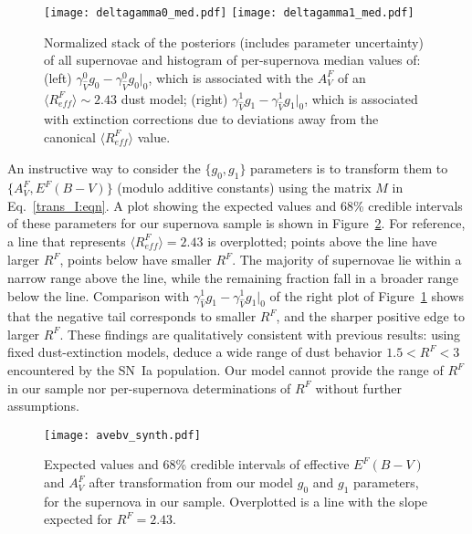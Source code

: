 \documentclass[trackchanges]{aastex62}   	%
\begin{document}
\begin{figure}[htbp] %
   \centering
   \texttt{[image: deltagamma0\_med.pdf]}
   \texttt{[image: deltagamma1\_med.pdf]}
      \caption{
      Normalized stack of the posteriors (includes parameter uncertainty) of all supernovae  and histogram 
      of  per-supernova 
median values of: (left) $\gamma^0_{\hat{V}} g_0-\gamma^0_{\hat{V}} g_0|_0$, which is associated with the $A^F_V$ of an $\langle R^F_{\mathit{eff}}\rangle \sim 2.43$ dust model;
(right) $\gamma^1_{\hat{V}} g_1-\gamma^1_{\hat{V}} g_1|_0$,
which  is associated with extinction corrections due to deviations away from the canonical $\langle R^F_{\mathit{eff}}\rangle$ value.
   \label{k0_med:fig}}
\end{figure}

An instructive way to consider the  $\{g_0, g_1\}$ parameters is
to transform them to $\{A_V^F, E^F(B-V)\}$ (modulo additive constants)   using the
matrix $M$ in  Eq.~\ref{trans_I:eqn}.
A plot showing the expected values and 68\% credible intervals of these parameters
for our supernova
sample is shown in Figure~\ref{kk:fig}. 
For reference, a line that represents $\langle R^F_{\mathit{eff}}\rangle=2.43$ is overplotted; points above
the line have larger $R^F$, points below have smaller $R^F$.  The majority of supernovae lie within a narrow range above the line,
while the remaining fraction fall in a broader range below the line.
Comparison with  $\gamma^1_{\hat{V}} g_1-\gamma^1_{\hat{V}} g_1|_0$ of the right plot of Figure~\ref{k0_med:fig}
shows that the 
negative tail corresponds to smaller $R^F$, and the sharper positive edge to larger $R^F$.
These findings are qualitatively consistent with previous results:
using fixed dust-extinction models,
\citet{2014ApJ...789...32B, 2015MNRAS.453.3300A} deduce a wide range of dust behavior $1.5<R^F<3$ encountered by the SN~Ia population.
Our model cannot provide the range of $R^F$ in our sample nor per-supernova determinations of $R^F$ 
without further assumptions.

\begin{figure}[htbp] %
   \centering
   \texttt{[image: avebv\_synth.pdf]}
      \caption{
      Expected values and 68\% credible intervals of effective $E^F(B-V)$ and $A_V^F$ after transformation from our model $g_0$ and $g_1$ parameters, for the supernova in our sample.
      Overplotted is a line with the slope expected for $R^F=2.43$.
   \label{kk:fig}}
\end{figure}
\end{document}
